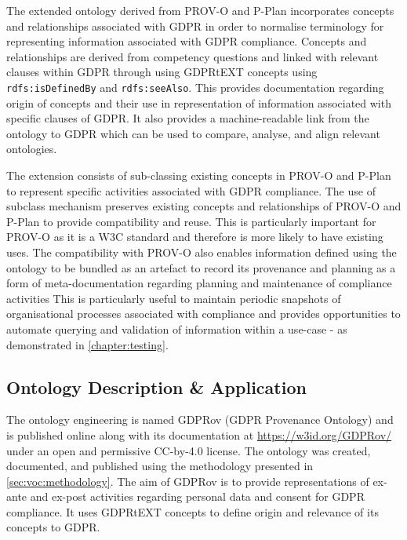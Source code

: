 The extended ontology derived from PROV-O and P-Plan incorporates concepts and relationships associated with GDPR in order to normalise terminology for representing information associated with GDPR compliance.
Concepts and relationships are derived from competency questions and linked with relevant clauses within GDPR through using GDPRtEXT concepts using \texttt{rdfs:isDefinedBy} and \texttt{rdfs:seeAlso}.
This provides documentation regarding origin of concepts and their use in representation of information associated with specific clauses of GDPR.
It also provides a machine-readable link from the ontology to GDPR which can be used to compare, analyse, and align relevant ontologies.

The extension consists of sub-classing existing concepts in PROV-O and P-Plan to represent specific activities associated with GDPR compliance. 
The use of subclass mechanism preserves existing concepts and relationships of PROV-O and P-Plan to provide compatibility and reuse. This is particularly important for PROV-O as it is a W3C standard and therefore is more likely to have existing uses.
The compatibility with PROV-O also enables information defined using the ontology to be bundled as an artefact to record its provenance and planning as a form of meta-documentation regarding planning and maintenance of compliance activities This is particularly useful to maintain periodic snapshots of organisational processes associated with compliance and provides opportunities to automate querying and validation of information within a use-case - as demonstrated in \autoref{chapter:testing}.

\subsection{Ontology Description \& Application}
The ontology engineering is named GDPRov (GDPR Provenance Ontology) and is published online along with its documentation at \url{https://w3id.org/GDPRov/} under an open and permissive CC-by-4.0 license.
The ontology was created, documented, and published using the methodology presented in \autoref{sec:voc:methodology}.
The aim of GDPRov is to provide representations of ex-ante and ex-post activities regarding personal data and consent for GDPR compliance.
It uses GDPRtEXT concepts to define origin and relevance of its concepts to GDPR.

